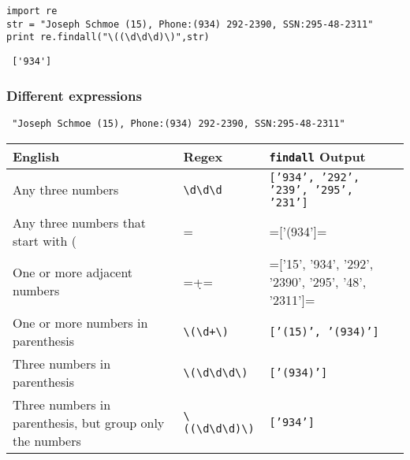 \documentclass[11pt]{article}
\begin{document}
\begin{verbatim}
import re
str = "Joseph Schmoe (15), Phone:(934) 292-2390, SSN:295-48-2311"  
print re.findall("\((\d\d\d)\)",str)
\end{verbatim}

\begin{verbatim}
 ['934']
\end{verbatim}

    
\subsubsection{Different expressions}
\label{sec-3-1-2}

\begin{verbatim}
 "Joseph Schmoe (15), Phone:(934) 292-2390, SSN:295-48-2311"  
\end{verbatim}

\begin{center}
\begin{tabular}{l|l|l}
 English                                                   &  Regex                                                                                             &  \texttt{findall} Output                              \\
\hline
 Any three numbers                                         &  \texttt{\textbackslash{}d\textbackslash{}d\textbackslash{}d}                                      &  \texttt{['934', '292', '239', '295', '231']}         \\
 Any three numbers that start with (                       &  =\(\d\d\d=                                                                                        &  =['(934']=                                           \\
 One or more adjacent numbers                              &  =\d+=                                                                                             &  =['15', '934', '292', '2390', '295', '48', '2311']=  \\
 One or more numbers in parenthesis                        &  \texttt{\textbackslash{}(\textbackslash{}d+\textbackslash{})}                                     &  \texttt{['(15)', '(934)']}                           \\
 Three numbers in parenthesis                              &  \texttt{\textbackslash{}(\textbackslash{}d\textbackslash{}d\textbackslash{}d\textbackslash{})}    &  \texttt{['(934)']}                                   \\
 Three numbers in parenthesis, but group only the numbers  &  \texttt{\textbackslash{}((\textbackslash{}d\textbackslash{}d\textbackslash{}d)\textbackslash{})}  &  \texttt{['934']}                                     \\
\end{tabular}
\end{center}
\end{document}
